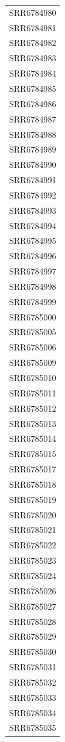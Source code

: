 \documentclass[12pt, a4paper]{report}
\begin{document}
\begin{center}
\begin{longtable}{c}
		SRR6784980\\
		SRR6784981\\
		SRR6784982\\
		SRR6784983\\
		SRR6784984\\
		SRR6784985\\
		SRR6784986\\
		SRR6784987\\
		SRR6784988\\
		SRR6784989\\
		SRR6784990\\
		SRR6784991\\
		SRR6784992\\
		SRR6784993\\
		SRR6784994\\
		SRR6784995\\
		SRR6784996\\
		SRR6784997\\
		SRR6784998\\
		SRR6784999\\
		SRR6785000\\
		SRR6785005\\
		SRR6785006\\
		SRR6785009\\
		SRR6785010\\
		SRR6785011\\
		SRR6785012\\
		SRR6785013\\
		SRR6785014\\
		SRR6785015\\
		SRR6785017\\
		SRR6785018\\
		SRR6785019\\
		SRR6785020\\
		SRR6785021\\
		SRR6785022\\
		SRR6785023\\
		SRR6785024\\
		SRR6785026\\
		SRR6785027\\
		SRR6785028\\
		SRR6785029\\
		SRR6785030\\
		SRR6785031\\
		SRR6785032\\
		SRR6785033\\
		SRR6785034\\
		SRR6785035\\

\end{longtable}
\end{center}
\end{document}
